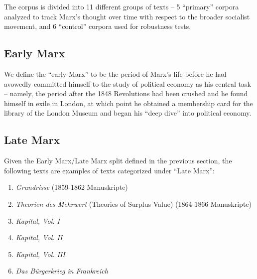 \noindent The corpus is divided into 11 different groups of texts -- 5 ``primary'' corpora analyzed to track Marx's thought over time with respect to the broader socialist movement, and 6 ``control'' corpora used for robustness tests.

\subsection{Early Marx\label{app:earlymarx}}

We define the ``early Marx'' to be the period of Marx's life before he had avowedly committed himself to the study of political economy as his central task -- namely, the period after the 1848 Revolutions had been crushed and he found himself in exile in London, at which point he obtained a membership card for the library of the London Museum and began his ``deep dive'' into political economy.



\subsection{Late Marx\label{app:latemarx}}

Given the Early Marx/Late Marx split defined in the previous section, the following texts are examples of texts categorized under ``Late Marx'':
\begin{enumerate}
    \item \textit{Grundrisse} (1859-1862 Manuskripte)
    \item \textit{Theorien des Mehrwert} (Theories of Surplus Value) (1864-1866 Manuskripte)
    \item \textit{Kapital, Vol. I}
    \item \textit{Kapital, Vol. II}
    \item \textit{Kapital, Vol. III}
    \item \textit{Das Bürgerkrieg in Frankreich}
\end{enumerate}

